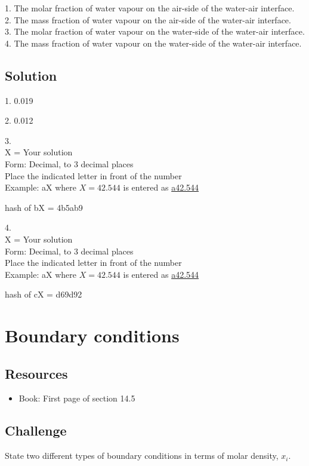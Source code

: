 1. The molar fraction of water vapour on the air-side of the water-air interface.\\
2. The mass fraction of water vapour on the air-side of the water-air interface.\\
3. The molar fraction of water vapour on the water-side of the water-air interface.\\
4. The mass fraction of water vapour on the water-side of the water-air interface.

\subsection*{Solution}
1. \num{0.019}

2. \num{0.012}

3.\\
X = Your solution\\
Form: Decimal, to 3 decimal places\\
Place the indicated letter in front of the number\\
Example: aX where $X=42.544$ is entered as \href{http://www.wolframalpha.com/input/?i=md5+hash+of+\%22a42.544\%22}{a42.544}

hash of bX = 4b5ab9

4.\\
X = Your solution\\
Form: Decimal, to 3 decimal places\\
Place the indicated letter in front of the number\\
Example: aX where $X=42.544$ is entered as \href{http://www.wolframalpha.com/input/?i=md5+hash+of+\%22a42.544\%22}{a42.544}

hash of cX = d69d92




\newpage
\section{Boundary conditions}

\subsection*{Resources}
\begin{itemize}
    \item Book: First page of section 14.5
\end{itemize}

\subsection*{Challenge}
State two different types of boundary conditions in terms of molar density, $x_i$.


